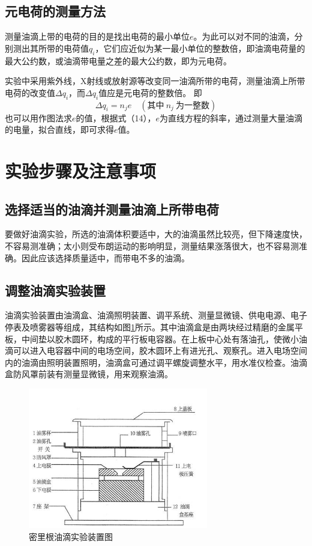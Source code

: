 \documentclass[fontset=windows,16pt]{ctexart}
\begin{document}
\subsection{元电荷的测量方法}
测量油滴上带的电荷的目的是找出电荷的最小单位\( e \)。为此可以对不同的油滴，分别测出其所带的电荷值\( q_i \)，它们应近似为某一最小单位的整数倍，即油滴电荷量的最大公约数，或油滴带电量之差的最大公约数，即为元电荷。

实验中采用紫外线，X射线或放射源等改变同一油滴所带的电荷，测量油滴上所带电荷的改变值\( \Delta q_i \)，而\( \Delta q_i \)值应是元电荷的整数倍。
即
\[
\Delta q_i = n_j e \quad (\text{其中} \ n_j \ \text{为一整数}) \tag{14}
\]
也可以用作图法求\( e \)的值，根据式（14），\( e \)为直线方程的斜率，通过测量大量油滴的电量，拟合直线，即可求得\( e \)值。


\section{实验步骤及注意事项}

\subsection{选择适当的油滴并测量油滴上所带电荷}
要做好油滴实验，所选的油滴体积要适中，大的油滴虽然比较亮，但下降速度快，不容易测准确；太小则受布朗运动的影响明显，测量结果涨落很大，也不容易测准确。因此应该选择质量适中，而带电不多的油滴。

\subsection{调整油滴实验装置}
油滴实验装置由油滴盒、油滴照明装置、调平系统、测量显微镜、供电电源、电子停表及喷雾器等组成，其结构如图\ref{fig:apparatus}所示。其中油滴盒是由两块经过精磨的金属平板，中间垫以胶木圆环，构成的平行板电容器。在上板中心处有落油孔，使微小油滴可以进入电容器中间的电场空间，胶木圆环上有进光孔、观察孔。进入电场空间内的油滴由照明装置照明，油滴盒可通过调平螺旋调整水平，用水准仪检查。油滴盒防风罩前装有测量显微镜，用来观察油滴。

\begin{figure}[H]
    \centering
    \includegraphics[width=0.7\textwidth]{img/装置.png.jpg}
    \caption{密里根油滴实验装置图}
    \label{fig:apparatus}
\end{figure}
\end{document}
